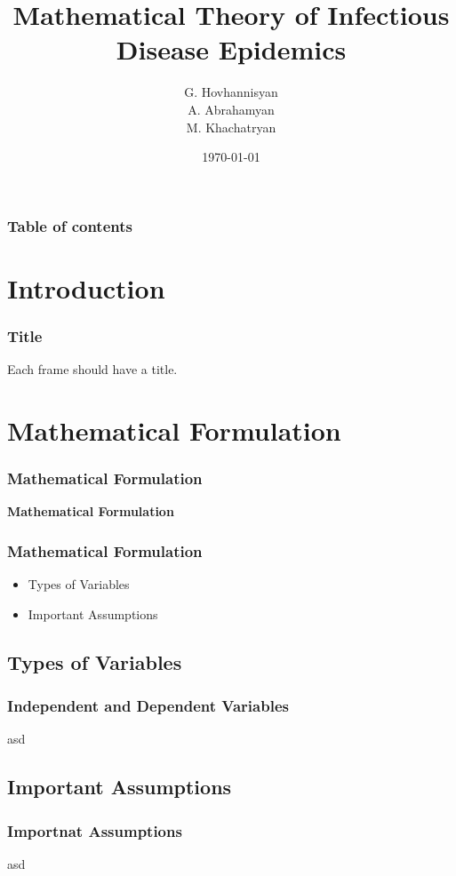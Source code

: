 \documentclass{beamer}
\begin{document}
\title{Mathematical Theory of Infectious Disease Epidemics}
\author{G. Hovhannisyan\\
A. Abrahamyan\\
M. Khachatryan}
\date{\today}


\begin{frame}
\titlepage
\end{frame}

\begin{frame}\frametitle{Table of contents}\tableofcontents
\end{frame}


\section{Introduction}
\begin{frame}\frametitle{Title}
\begin{center}
    Each frame should have a title.
\end{center}
\end{frame}


\section{Mathematical Formulation}
\begin{frame}\frametitle{Mathematical Formulation}
\begin{center}
    \textbf{Mathematical Formulation}
\end{center}
\end{frame}


\begin{frame}\frametitle{Mathematical Formulation}
\begin{itemize}
\item Types of Variables
\item Important Assumptions
\end{itemize}
\end{frame}

\subsection{Types of Variables}
\begin{frame}\frametitle{Independent and Dependent Variables}
    asd
\end{frame}

\subsection{Important Assumptions}
\begin{frame}\frametitle{Importnat Assumptions}
    asd
\end{frame}
\end{document}

